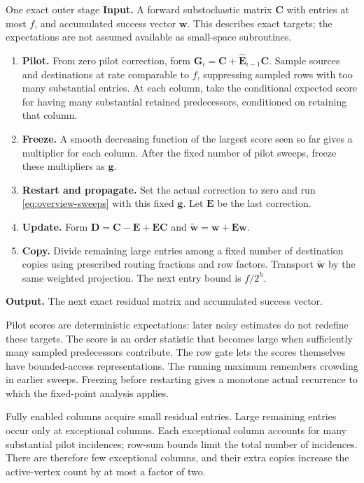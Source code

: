 \documentclass[11pt]{article}
\numberwithin{equation}{section}
\theoremstyle{definition}
\theoremstyle{remark}
\begin{document}
\begin{algorithm}[label=alg:overview-stage]{One exact outer stage}
\textbf{Input.} A forward substochastic matrix \(\mathbf C\) with entries at most \(f\), and accumulated success vector \(\mathbf w\). This describes exact targets; the expectations are not assumed available as small-space subroutines.
\begin{enumerate}[leftmargin=*]
\item \textbf{Pilot.} From zero pilot correction, form \(\mathbf G_i=\mathbf C+\widehat{\mathbf E}_{i-1}\mathbf C\). Sample sources and destinations at rate comparable to \(f\), suppressing sampled rows with too many substantial entries. At each column, take the conditional expected score for having many substantial retained predecessors, conditioned on retaining that column.
\item \textbf{Freeze.} A smooth decreasing function of the largest score seen so far gives a multiplier for each column. After the fixed number of pilot sweeps, freeze these multipliers as \(\mathbf g\).
\item \textbf{Restart and propagate.} Set the actual correction to zero and run \eqref{eq:overview-sweeps} with this fixed \(\mathbf g\). Let \(\mathbf E\) be the last correction.
\item \textbf{Update.} Form \(\mathbf D=\mathbf C-\mathbf E+\mathbf E\mathbf C\) and \(\widetilde{\mathbf w}=\mathbf w+\mathbf E\mathbf w\).
\item \textbf{Copy.} Divide remaining large entries among a fixed number of destination copies using prescribed routing fractions and row factors. Transport \(\widetilde{\mathbf w}\) by the same weighted projection. The next entry bound is \(f/2^h\).
\end{enumerate}
\textbf{Output.} The next exact residual matrix and accumulated success vector.
\end{algorithm}

Pilot scores are deterministic expectations: later noisy estimates do not redefine these targets. The score is an order statistic that becomes large when sufficiently many sampled predecessors contribute. The row gate lets the scores themselves have bounded-access representations. The running maximum remembers crowding in earlier sweeps. Freezing before restarting gives a monotone actual recurrence to which the fixed-point analysis applies.

Fully enabled columns acquire small residual entries. Large remaining entries occur only at exceptional columns. Each exceptional column accounts for many substantial pilot incidences; row-sum bounds limit the total number of incidences. There are therefore few exceptional columns, and their extra copies increase the active-vertex count by at most a factor of two.
\end{document}
